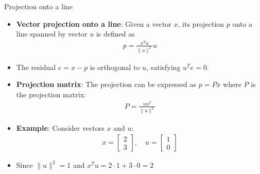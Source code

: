 \begin{frame}{Projection onto a line}
\begin{itemize}
    \item \textbf{Vector projection onto a line}: Given a vector $x$, its projection $p$ onto a line spanned by vector $u$ is defined as 
    \begin{align}
        p = \frac{x^T u}{\|u\|^2}u
    \end{align}
    \item The residual $e = x - p$ is orthogonal to $u$, satisfying $u^Te = 0$.
    \item \textbf{Projection matrix}: The projection can be expressed as $p = Px$ where $P$ is the projection matrix:
    \begin{align}
        P = \frac{uu^T}{\|u\|^2} 
    \end{align}
 \end{itemize}
\end{frame}

\begin{frame}{}
\begin{center}
\end{center}
\begin{itemize}
\item \textbf{Example}: Consider vectors $x$ and $u$:
    \begin{align*}
        x = \begin{bmatrix}
            2\\3
        \end{bmatrix}, \quad u =\begin{bmatrix}
            1\\0
        \end{bmatrix}
    \end{align*}
    \item Since $\|u\|^2 = 1$ and $x^T u = 2 \cdot 1 + 3 \cdot 0 = 2$
\end{itemize}
\end{frame}

